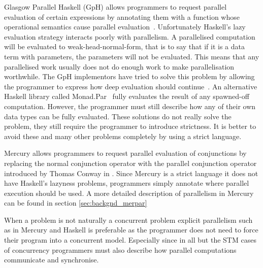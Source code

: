 Glasgow Parallel Haskell (GpH) allows programmers to request parallel
evaluation of certain expressions by annotating them with a function
whose operational semantics cause parallel
evaluation~\citep{gph,loidi:2008:gph-semiexplicit-parallelism}.
Unfortunately Haskell's lazy evaluation strategy interacts poorly with
parallelism.
A parallelised computation will be evaluated to weak-head-normal-form,
that is to say that if it is a data term with parameters,
the parameters will not be evaluated.
This means that any parallelised work usually does not do enough work to
make parallelisation worthwhile.
The GpH implementors have tried to solve this problem by allowing
the programmer to express how deep evaluation should
continue~\citep{trinder:98:strategies}.
An alternative Haskell library called Monad.Par~\citep{marlow:monadpar}
fully evaluates the result of any spawned-off computation.
However, the programmer must still describe how any of their own
data types can be fully evaluated.
These solutions do not really solve the problem,
they still require the programmer to introduce strictness.
It is better to avoid these and many other problems completely by using
a strict language.

\label{ref:parallel_conjunction}
Mercury allows programmers to request parallel evaluation of
conjunctions by replacing the normal conjunction operator with the
parallel conjunction operator introduced by Thomas Conway in
\citep{conway:2002:par,wang:2006:hons,wang:2011:dep-par}.
Since Mercury is a strict language it does not have Haskell's
lazyness problems,
programmers simply annotate where parallel execution
should be used.
A more detailed description of parallelism in Mercury can be found in
section \ref{sec:backgnd_merpar}

When a problem is not naturally a concurrent problem 
explicit parallelism such as in Mercury and Haskell
is preferable as the programmer does not need to force their program
into a concurrent model.
Especially since in all but the STM cases of concurrency programmers
must also describe how parallel computations communicate and
synchronise.


